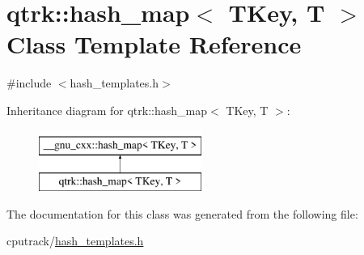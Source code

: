 \hypertarget{classqtrk_1_1hash__map}{}\section{qtrk\+:\+:hash\+\_\+map$<$ T\+Key, T $>$ Class Template Reference}
\label{classqtrk_1_1hash__map}


{\ttfamily \#include $<$hash\+\_\+templates.\+h$>$}

Inheritance diagram for qtrk\+:\+:hash\+\_\+map$<$ T\+Key, T $>$\+:\begin{figure}[H]
\begin{center}
\leavevmode
\includegraphics[height=2.000000cm]{classqtrk_1_1hash__map}
\end{center}
\end{figure}


The documentation for this class was generated from the following file\+:\begin{DoxyCompactItemize}
\item 
cputrack/\hyperlink{hash__templates_8h}{hash\+\_\+templates.\+h}\end{DoxyCompactItemize}
